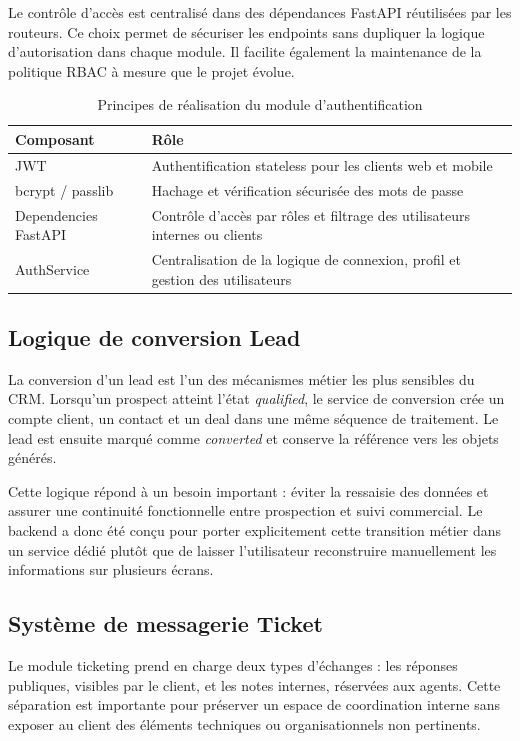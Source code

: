 Le contrôle d'accès est centralisé dans des dépendances FastAPI réutilisées par les routeurs. Ce choix permet de sécuriser les endpoints sans dupliquer la logique d'autorisation dans chaque module. Il facilite également la maintenance de la politique RBAC à mesure que le projet évolue.

\begin{table}[H]
\centering
\caption{Principes de réalisation du module d'authentification}
\label{tab:auth_backend}
\begin{tabularx}{\textwidth}{|l|X|}
\hline
\textbf{Composant} & \textbf{Rôle} \\
\hline
JWT & Authentification stateless pour les clients web et mobile \\
\hline
bcrypt / passlib & Hachage et vérification sécurisée des mots de passe \\
\hline
Dependencies FastAPI & Contrôle d'accès par rôles et filtrage des utilisateurs internes ou clients \\
\hline
AuthService & Centralisation de la logique de connexion, profil et gestion des utilisateurs \\
\hline
\end{tabularx}
\end{table}

\subsection{Logique de conversion Lead}
La conversion d'un lead est l'un des mécanismes métier les plus sensibles du CRM. Lorsqu'un prospect atteint l'état \textit{qualified}, le service de conversion crée un compte client, un contact et un deal dans une même séquence de traitement. Le lead est ensuite marqué comme \textit{converted} et conserve la référence vers les objets générés.\par
\vspace{0.3cm}

Cette logique répond à un besoin important : éviter la ressaisie des données et assurer une continuité fonctionnelle entre prospection et suivi commercial. Le backend a donc été conçu pour porter explicitement cette transition métier dans un service dédié plutôt que de laisser l'utilisateur reconstruire manuellement les informations sur plusieurs écrans.

\subsection{Système de messagerie Ticket}
Le module ticketing prend en charge deux types d'échanges : les réponses publiques, visibles par le client, et les notes internes, réservées aux agents. Cette séparation est importante pour préserver un espace de coordination interne sans exposer au client des éléments techniques ou organisationnels non pertinents.\par
\vspace{0.3cm}


